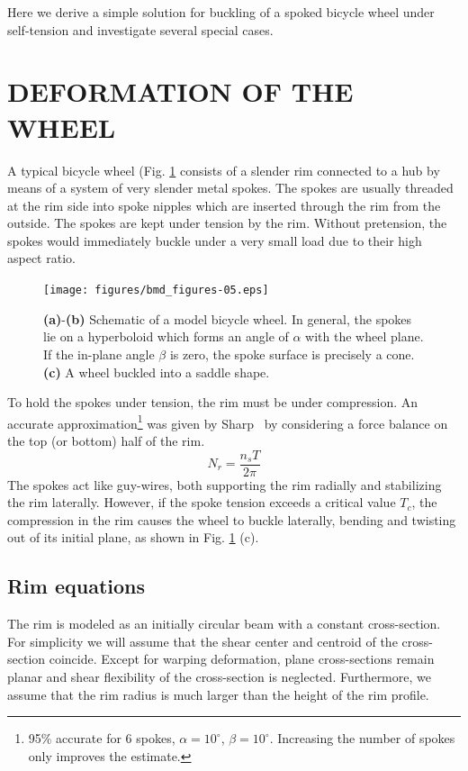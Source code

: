 \documentclass{bmd2016p}
\begin{document}
Here we derive a simple solution for buckling of a spoked bicycle wheel under self-tension and investigate several special cases.




\section{DEFORMATION OF THE WHEEL}
A typical bicycle wheel (Fig. \ref{fig:schematic} consists of a slender rim connected to a hub by means of a system of very slender metal spokes. The spokes are usually threaded at the rim side into spoke nipples which are inserted through the rim from the outside. The spokes are kept under tension by the rim. Without pretension, the spokes would immediately buckle under a very small load due to their high aspect ratio.

\begin{figure}[!h]
\centering
\texttt{[image: figures/bmd\_figures-05.eps]}
\caption{\textbf{(a)}-\textbf{(b)} Schematic of a model bicycle wheel. In general, the spokes lie on a hyperboloid which forms an angle of $\alpha$ with the wheel plane. If the in-plane angle $\beta$ is zero, the spoke surface is precisely a cone. \textbf{(c)} A wheel buckled into a saddle shape.}
\label{fig:schematic}
\end{figure}

To hold the spokes under tension, the rim must be under compression. An accurate approximation\footnote{95\% accurate for 6 spokes, $\alpha=10^{\circ}$, $\beta=10^{\circ}$. Increasing the number of spokes only improves the estimate.} was given by Sharp~\cite{Sharp1977a} by considering a force balance on the top (or bottom) half of the rim.
	\begin{equation}\label{eq:TN}
	N_r = \frac{n_sT}{2\pi}
	\end{equation}
The spokes act like guy-wires, both supporting the rim radially and stabilizing the rim laterally. However, if the spoke tension exceeds a critical value $T_c$, the compression in the rim causes the wheel to buckle laterally, bending and twisting out of its initial plane, as shown in Fig. \ref{fig:schematic} (c).


\subsection{Rim equations}

The rim is modeled as an initially circular beam with a constant cross-section. For simplicity we will assume that the shear center and centroid of the cross-section coincide. Except for warping deformation, plane cross-sections remain planar and shear flexibility of the cross-section is neglected. Furthermore, we assume that the rim radius is much larger than the height of the rim profile.
\end{document}
